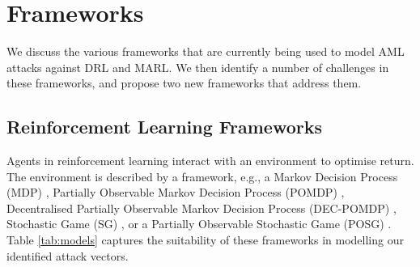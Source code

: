 \documentclass[conference,compsoc]{IEEEtran}
\begin{document}






\section{Frameworks}

We discuss the various frameworks that are currently being used to model AML attacks against DRL and MARL. We then identify a number of challenges in these frameworks, and propose two new frameworks that address them.

\subsection{Reinforcement Learning Frameworks}
\label{sec:rl_model}

Agents in reinforcement learning \cite{kaelbling_reinforcement_1996}  interact with an environment to optimise return. The environment is described by a framework, e.g., a Markov Decision Process (MDP) \cite{bellman_markovian_1957}, Partially Observable Markov Decision Process (POMDP) \cite{astrom_optimal_1965}, Decentralised Partially Observable Markov Decision Process (DEC-POMDP) \cite{bernstein_complexity_2013}, Stochastic Game (SG) \cite{shapley_stochastic_1953}, or a Partially Observable Stochastic Game (POSG) \cite{hansen_dynamic_2004}.  Table \ref{tab:models} captures the suitability of these frameworks in modelling our identified attack vectors.  
\end{document}
